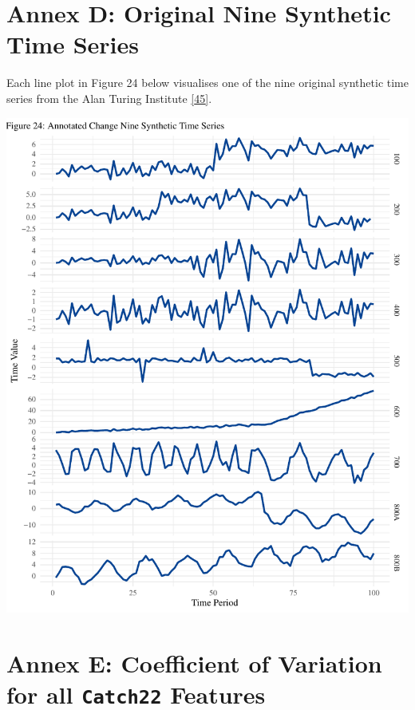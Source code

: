 \documentclass{article}
\begin{document}
\newpage

\hypertarget{annex-d-original-nine-synthetic-time-series}{%
\section{Annex D: Original Nine Synthetic Time
Series}\label{annex-d-original-nine-synthetic-time-series}}

\vspace{-0.4cm}

Each line plot in Figure 24 below visualises one of the nine original
synthetic time series from the Alan Turing Institute
\protect\hyperlink{ref-ATIChangePoint}{{[}45{]}}.

\includegraphics{210431461_CSC8639_Dissertation_files/figure-latex/unnamed-chunk-20-1.pdf}

\newpage

\hypertarget{annex-e-coefficient-of-variation-for-all-catch22-features}{%
\section{\texorpdfstring{Annex E: Coefficient of Variation for all
\texttt{Catch22}
Features}{Annex E: Coefficient of Variation for all Catch22 Features}}\label{annex-e-coefficient-of-variation-for-all-catch22-features}}
\end{document}
